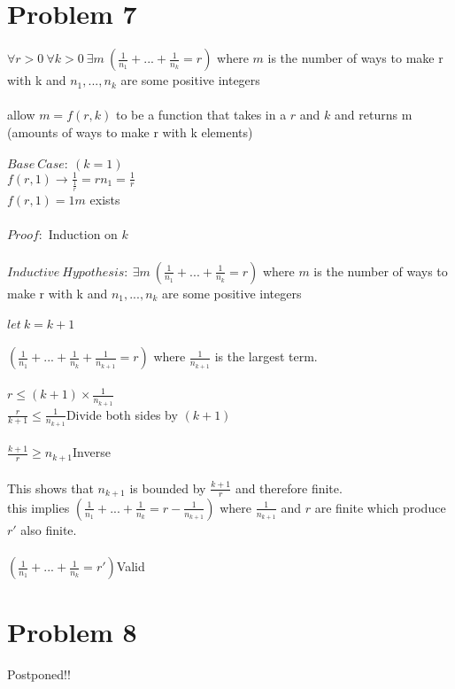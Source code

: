 \documentclass[11pt,letterpaper]{article}
\begin{document}
\begin{enumerate}[(a)]
\end{enumerate}
\clearpage

\section*{Problem 7}
$\forall r>0~\forall k>0~\exists m~(\frac{1}{n_1}+...+\frac{1}{n_k} = r)$ where $m$ is the number of ways to make r with k and $n_1,...,n_k$ are some positive integers\\
\\
allow $m=f(r,k)$ to be a function that takes in a $r$ and $k$ and returns m (amounts of ways to make r with k elements)\\
\\
$Base~Case:~(k=1)$\\
$f(r,1)\rightarrow \frac{1}{\frac{1}{r}} = r$\hfill $n_1 = \frac{1}{r}$\\
$f(r,1)=1$\hfill $m$ exists\\
\\
$Proof:$ Induction on $k$\\
\\
$Inductive~Hypothesis:~\exists m~(\frac{1}{n_1}+...+\frac{1}{n_k} = r)$ where $m$ is the number of ways to make r with k and $n_1,...,n_k$ are some positive integers\\
\\
$let~k=k+1$\\
\\
$(\frac{1}{n_1}+...+\frac{1}{n_k} + \frac{1}{n_{k+1}}= r)$ where $\frac{1}{n_{k+1}}$ is the largest term.\\
\\
$r\leq(k+1)\times\frac{1}{n_{k+1}}$\\
$\frac{r}{k+1}\leq\frac{1}{n_{k+1}}$\hfill Divide both sides by $(k+1)$\\
\\
$\frac{k+1}{r}\geq n_{k+1}$\hfill Inverse\\
\\
This shows that $n_{k+1}$ is bounded by $\frac{k+1}{r}$ and therefore finite.\\
this implies 
$(\frac{1}{n_1}+ ... +\frac{1}{n_k} = r-\frac{1}{n_{k+1}})$ where $\frac{1}{n_{k+1}}$ and $r$ are finite which produce $r\prime$ also finite.\\
\\
$(\frac{1}{n_1}+...+\frac{1}{n_k} = r\prime)$\hfill Valid\\
\clearpage
\section*{Problem 8}
Postponed!!
\end{document}
